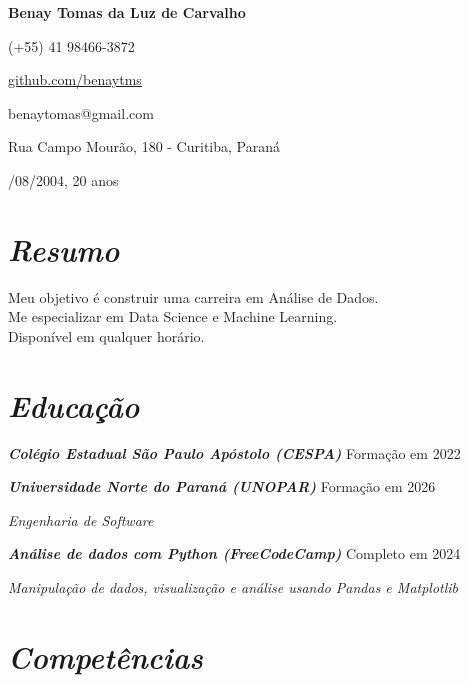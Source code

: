 \documentclass{article}
\newcommand{\cvsection}[1]{\section*{\rmfamily\textit{#1}}}
\begin{document}
\selectfont

\begin{center}
    \Huge{
    \rmfamily
    \textbf{Benay Tomas da Luz de Carvalho}}
\end{center}
\vspace{5pt}


\setlength{\parskip}{1pt}
\renewcommand{\arraystretch}{1.25}


\begin{center}

{\large

\noindent (+55) 41 98466-3872

\noindent \href{https://github.com/benaytms}{github.com/benaytms}

\noindent benaytomas@gmail.com

\noindent Rua Campo Mourão, 180 - Curitiba, Paraná

/08/2004, 20 anos

}

\end{center}

\setlength{\parskip}{3pt}

\cvsection{Resumo}

\indent
{\large

Meu objetivo é construir uma carreira em Análise de Dados.\\
\indent Me especializar em Data Science e Machine Learning.\\
\indent Disponível em qualquer horário.

}

\cvsection{Educação}
\indent 
{\large

\textbf{\textit{Colégio Estadual São Paulo Apóstolo (CESPA)}} \hfill Formação em 2022

\textbf{\textit{Universidade Norte do Paraná (UNOPAR)}} \hfill Formação em 2026

\hspace{2em}\textit{Engenharia de Software}

\textbf{\textit{Análise de dados com Python (FreeCodeCamp)}} \hfill Completo em 2024

\hspace{2em}\textit{Manipulação de dados, visualização e análise usando Pandas e Matplotlib}
}

\vspace*{.15cm}
\cvsection{Competências}
\noindent
\end{document}
